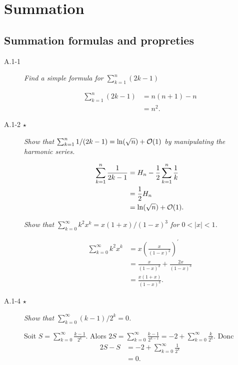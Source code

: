 \section{Summation}


\subsection{Summation formulas and propreties}

\begin{description}
  \item [A.1-1] {\itshape Find a simple formula for $\sum_{k=1}^n(2k-1)$ }
   \begin{ex}
  \begin{align*}
    \sum_{k=1}^n(2k-1)  & = n(n+1)-n\\
    &= n^2.
  \end{align*}
\end{ex}
\item[A.1-2 $\star$]  {\itshape Show that $\sum_{k=1}^n1/(2k-1) = \ln (\sqrt{n}) + \mathcal{O}(1)$ by manipulating the harmonic series.}
    \begin{ex}
      \begin{align*}
        \sum_{k=1}^n \frac{1}{2k-1} &= H_n - \frac{1}{2}\sum_{k=1}^n\frac{1}{k}\\
       &= \frac{1}{2}H_n\\
       &= \ln(\sqrt{n}) + \mathcal{O}(1).
      \end{align*}
    \end{ex}
   {\itshape Show that $\sum_{k=0}^{\infty} k^2x^k = x(1+x)/(1-x)^3$ for $ 0 < |x| < 1$.}
    \begin{ex}
    \begin{align*}
  \sum_{k=0}^\infty k^2x^k & = x \left( \frac{x}{(1-x)^2} \right)^\prime\\
      &= \frac{x}{(1-x)^2}+\frac{2x}{(1-x)^3}\\
      &= \frac{x(1+x)}{(1-x)^3}.
    \end{align*}
  \end{ex}
\item[A.1-4 $\star$] {\itshape Show that $\sum^\infty_{k=0}(k-1)/2^k = 0$.}
    \begin{ex}
    Soit $S=\sum_{k=0}^\infty\frac{k-1}{2^k}$. Alors $2S = \sum_{k=0}^{\infty}\frac{k-1}{2^{k-1}}= -2 + \sum_{k=0}^\infty\frac{k}{2^k}$. Donc 
    \begin{align*}
      2S-S &= -2 + \sum_{k=0}^\infty\frac{1}{2^k}\\
      &= 0.

\end{align*}
\end{ex}
\end{description}
